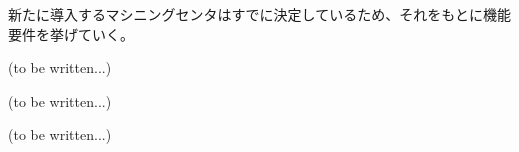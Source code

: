 

新たに導入するマシニングセンタはすでに決定しているため、それをもとに機能要件を挙げていく。



(to be written...)



(to be written...)



(to be written...)




